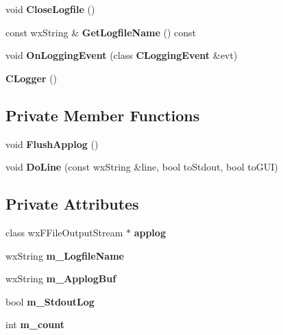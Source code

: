 \begin{DoxyCompactItemize}
\item 
void {\bf CloseLogfile} ()\label{classCLogger_a1cd0fda9d10bb9ac453d8af4fc30ef75}

\item 
const wxString \& {\bf GetLogfileName} () const \label{classCLogger_a5150d92346e1bfc7426170ead32f4208}

\item 
void {\bf OnLoggingEvent} (class {\bf CLoggingEvent} \&evt)\label{classCLogger_a4e2bb4643bc87205ca94b45f18b6fbf4}

\item 
{\bf CLogger} ()\label{classCLogger_a9bee05627064da478ba32af360b8ef19}

\end{DoxyCompactItemize}
\subsection*{Private Member Functions}
\begin{DoxyCompactItemize}
\item 
void {\bf FlushApplog} ()\label{classCLogger_a803c3606cf26dfedfabe2ba8c1a2849e}

\item 
void {\bf DoLine} (const wxString \&line, bool toStdout, bool toGUI)\label{classCLogger_a879bb8970ee4f25642c717cadb262189}

\end{DoxyCompactItemize}
\subsection*{Private Attributes}
\begin{DoxyCompactItemize}
\item 
class wxFFileOutputStream $\ast$ {\bfseries applog}\label{classCLogger_a1ebbd16f8201353fe2ce585279f8a57c}

\item 
wxString {\bfseries m\_\-LogfileName}\label{classCLogger_a2b0b5c20ef4abe9d325646971cd8a334}

\item 
wxString {\bfseries m\_\-ApplogBuf}\label{classCLogger_a82ed70170ea664eae105ea6b24b8fc11}

\item 
bool {\bfseries m\_\-StdoutLog}\label{classCLogger_a379076f375f8710e6520d99811c3bcac}

\item 
int {\bfseries m\_\-count}\label{classCLogger_ae8b73f181c8be173cd5e5a160237bf73}

\end{DoxyCompactItemize}


